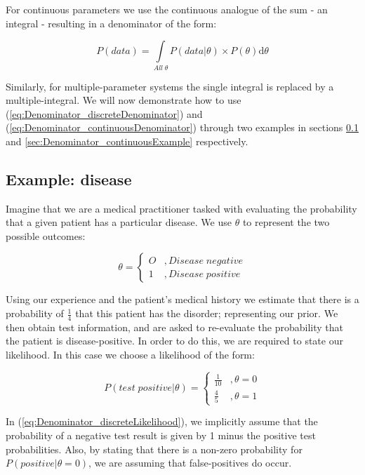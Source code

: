 \documentclass[11pt,fullpage]{book}
\begin{document}
For continuous parameters we use the continuous analogue of the sum - an integral - resulting in a denominator of the form:

\begin{equation}\label{eq:Denominator_continuousDenominator}
P(data) = \int\limits_{All\;\theta} P(data|\theta) \times P(\theta) \mathrm{d}\theta
\end{equation}

Similarly, for multiple-parameter systems the single integral is replaced by a multiple-integral. We will now demonstrate how to use (\ref{eq:Denominator_discreteDenominator}) and (\ref{eq:Denominator_continuousDenominator}) through two examples in sections \ref{sec:Denominator_discreteExample} and \ref{sec:Denominator_continuousExample} respectively.

\subsection{Example: disease}\label{sec:Denominator_discreteExample}
Imagine that we are a medical practitioner tasked with evaluating the probability that a given patient has a particular disease. We use $\theta$ to represent the two possible outcomes: 

\begin{equation}
\theta =
\begin{cases}
O & , Disease \; negative \\
1 & ,  Disease \; positive
\end{cases}
\end{equation}

Using our experience and the patient's medical history we estimate that there is a probability of $\frac{1}{4}$ that this patient has the disorder; representing our prior. We then obtain test information, and are asked to re-evaluate the probability that the patient is disease-positive. In order to do this, we are required to state our likelihood. In this case we choose a likelihood of the form:

\begin{equation}\label{eq:Denominator_discreteLikelihood}
P(test\;positive|\theta) =
\begin{cases}
\frac{1}{10} & , \theta=0\\
\frac{4}{5} & ,  \theta=1
\end{cases}
\end{equation}

In (\ref{eq:Denominator_discreteLikelihood}), we implicitly assume that the probability of a negative test result is given by 1 minus the positive test probabilities. Also, by stating that there is a non-zero probability for $P(positive|\theta=0)$, we are assuming that false-positives do occur.
\end{document}
